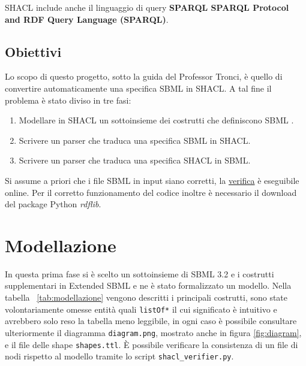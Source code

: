 \documentclass{article}
\begin{document}
SHACL include anche il linguaggio di query \textbf{SPARQL SPARQL Protocol and RDF Query Language (SPARQL)}.

\subsection{Obiettivi}

Lo scopo di questo progetto, sotto la guida del Professor Tronci, è quello di convertire automaticamente una specifica SBML in SHACL. A tal fine il problema è stato diviso in tre fasi:

\begin{enumerate}
    \item Modellare in SHACL un sottoinsieme dei costrutti che definiscono SBML . 
    \item Scrivere un parser che traduca una specifica SBML in SHACL.
    \item Scrivere un parser che traduca una specifica SHACL in SBML.
\end{enumerate}

Si assume a priori che i file SBML in input siano corretti, la \href{http://sbml.org/Facilities/Validator}{verifica} è eseguibile online. Per il corretto funzionamento del codice inoltre è necessario il download del package Python \textit{rdflib}.

\section{Modellazione}

In questa prima fase si è scelto un sottoinsieme di SBML 3.2 e i costrutti supplementari in Extended SBML e ne è stato formalizzato un modello. Nella tabella ~\ref{tab:modellazione} vengono descritti i principali costrutti, sono state volontariamente omesse entità quali \texttt{listOf*} il cui significato è intuitivo e avrebbero solo reso la tabella meno leggibile, in ogni caso è possibile consultare ulteriormente il diagramma \texttt{diagram.png}, mostrato anche in figura \ref{fig:diagram}, e il file delle shape \texttt{shapes.ttl}. È possibile verificare la consistenza di un file di nodi rispetto al modello tramite lo script \texttt{shacl\_verifier.py}.
\end{document}
